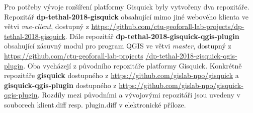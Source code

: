 \newpage
Pro potřeby vývoje rozšíření platformy Gisquick byly vytvořeny dva repozitáře. 
Repozitář \textbf{dp-tethal-2018-gisquick}
obsahující mimo jiné webového klienta ve větvi \textit{vue-client}, dostupný z 
\newline 
\url{https://github.com/ctu-geoforall-lab-projects/dp-tethal-2018-gisquick}. 
Dále repozitář \textbf{dp-tethal-2018-gisquick-qgis-plugin} obsahující zásuvný 
modul pro program QGIS ve větvi \textit{master}, dostupný z  
\newline 
\url{https://github.com/ctu-geoforall-lab-projects} 
\newline 
\url{/dp-tethal-2018-gisquick-qgis-plugin}.
\newline
Oba vycházejí z původního repozitáře platformy Gisquick. Konkrétně 
repozitáře \textbf{gisquick} dostupného z
\newline
\url{https://github.com/gislab-npo/gisquick}
\newline
a \textbf{gisquick-qgis-plugin} dostupného z
\newline
\url{https://github.com/gislab-npo/gisquick-qgis-plugin}.
\newline
Rozdíly mezi původními a vývojovými repozitáři jsou uvedeny v 
souborech klient.diff resp. plugin.diff v elektronické příloze. 

